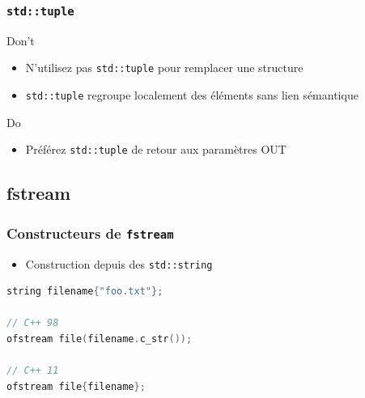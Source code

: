 \documentclass[C++.tex]{subfiles}
\begin{document}
\begin{frame}[fragile]
	\frametitle{\lstinline|std::tuple|}
	\begin{alertblock}{Don't}
		\begin{itemize}
			\item N'utilisez pas \lstinline|std::tuple| pour remplacer une structure
			\item \lstinline|std::tuple| regroupe localement des éléments sans lien sémantique
		\end{itemize}
	\end{alertblock}

	\begin{exampleblock}{Do}
		\begin{itemize}
			\item Préférez \lstinline|std::tuple| de retour aux paramètres OUT
		\end{itemize}
	\end{exampleblock}
\end{frame}

\subsection*{fstream}
\begin{frame}[fragile]
	\frametitle{Constructeurs de \lstinline|fstream|}
	\begin{itemize}
		\item Construction depuis des \lstinline|std::string|
	\end{itemize}

	\begin{lstlisting}[language=C++]
string filename{"foo.txt"};

// C++ 98
ofstream file(filename.c_str());

// C++ 11
ofstream file{filename};\end{lstlisting}
\end{frame}
\end{document}
